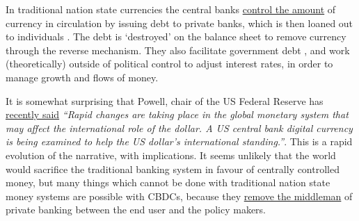 In traditional nation state currencies the central banks \href{https://www.bankofengland.co.uk/markets/bank-of-england-market-operations-guide}{control the amount} of currency in circulation by issuing debt to private banks, which is then loaned out to individuals \cite{wang2021central}. The debt is `destroyed' on the balance sheet to remove currency through the reverse mechanism. They also facilitate government debt \cite{filardo2012central}, and work (theoretically) outside of political control to adjust interest rates, in order to manage growth and flows of money. \par
It is somewhat surprising that Powell, chair of the US Federal Reserve has \href{https://www.federalreserve.gov/newsevents/speech/powell20220617a.htm}{recently said} \textit{``Rapid changes are taking place in the global monetary system that may affect the international role of the dollar. A US central bank digital currency is being examined to help the US dollar's international standing.''}. This is a rapid evolution of the narrative, with implications. It seems unlikely that the world would sacrifice the traditional banking system in favour of centrally controlled money, but many things which cannot be done with traditional nation state money systems are possible with CBDCs, because they \href{https://voxeu.org/article/benefits-central-bank-digital-currency}{remove the middleman} of private banking between the end user and the policy makers. 
